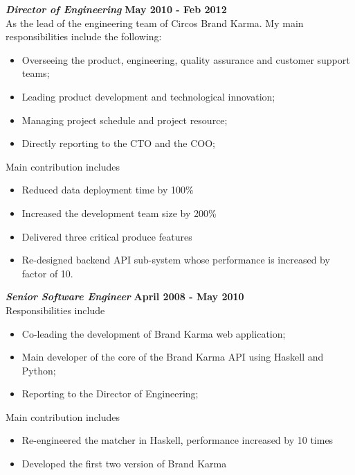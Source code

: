 \documentclass[margin,line]{res}
\newcommand{\ignore}[1]{}
\begin{document}
\begin{resume}
{\bf \em Director of Engineering} \hfill {\bf May 2010 - Feb 2012} \\
As the lead of the engineering team of Circos Brand Karma. My main responsibilities include the following:
\begin{itemize}
  \item Overseeing the product, engineering, quality assurance and customer support teams;
  \item Leading product development and technological innovation;
  \item Managing project schedule and project resource;
  \item Directly reporting to the CTO and the COO;
\end{itemize}
%
Main contribution includes
\begin{itemize}
  \item Reduced data deployment time by 100\%
  \item Increased the development team size by 200\%
  \item Delivered three critical produce features
  \item Re-designed backend API sub-system whose performance is increased by factor of 10.
\end{itemize}
%
{\bf \em Senior Software Engineer} \hfill {\bf April 2008 - May 2010} \\
Responsibilities include
\begin{itemize}
  \item Co-leading the development of Brand Karma web application;
  \item Main developer of the core of the Brand Karma API using Haskell and Python;
  \item Reporting to the Director of Engineering;
\end{itemize}
Main contribution includes
\begin{itemize}
  \item Re-engineered the matcher in Haskell, performance increased by 10 times
  \item Developed the first two version of Brand Karma
\end{itemize}
\ignore{
I was in charge of a few components in this products, 
\begin{itemize}
 \item Using Haskell, I developed a system that infers similarity among hotel brand information
   coming from various data sources, (e.g. booking.com and asiaroom.com) 

\end{itemize}}
\end{resume}
\end{document}

